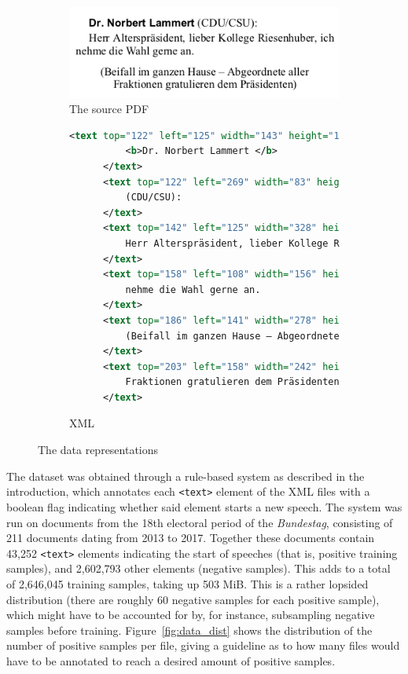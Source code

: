 \begin{figure}[htbp]
  \centering
  \begin{subfigure}[b]{0.6\textwidth} 
    \centering
    \includegraphics[width=\textwidth]{figures/source.png}
    \caption{The source PDF}
  \end{subfigure}
  \begin{subfigure}[b]{\textwidth}
	\centering
    \begin{lstlisting}[language=xml, morekeywords={text}]
      <text top="122" left="125" width="143" height="16" font="3">
          <b>Dr. Norbert Lammert </b>
      </text>
      <text top="122" left="269" width="83" height="17" font="4">
          (CDU/CSU):
      </text>
      <text top="142" left="125" width="328" height="17" font="4">
          Herr Alterspräsident, lieber Kollege Riesenhuber, ich
      </text>
      <text top="158" left="108" width="156" height="17" font="4">
          nehme die Wahl gerne an.
      </text>
      <text top="186" left="141" width="278" height="17" font="4">
          (Beifall im ganzen Hause – Abgeordnete aller
      </text>
      <text top="203" left="158" width="242" height="17" font="4">
          Fraktionen gratulieren dem Präsidenten)
      </text>
    \end{lstlisting}
    \caption{XML}
  \end{subfigure}
  \caption{The data representations}
  \label{fig:example}
\end{figure}

The dataset was obtained through a rule-based system as described in the
introduction, which annotates each \texttt{<text>} element of the XML files
with a boolean flag indicating whether said element starts a new speech. The
system was run on documents from the 18th electoral period of the
\emph{Bundestag}, consisting of 211 documents dating from 2013 to 2017. Together
these documents contain 43,252 \texttt{<text>} elements indicating the start of
speeches (that is, positive training samples), and 2,602,793 other elements
(negative samples). This adds to a total of 2,646,045 training samples, taking
up 503 MiB. This is a rather lopsided distribution (there are roughly 60
negative samples for each positive sample), which might have to be accounted for
by, for instance, subsampling negative samples before training.
Figure~\ref{fig:data_dist} shows the distribution of the number of positive
samples per file, giving a guideline as to how many files would have to be
annotated to reach a desired amount of positive samples.

